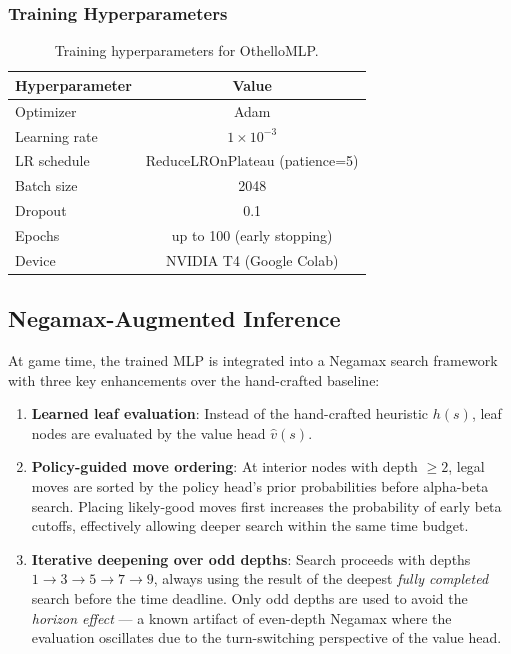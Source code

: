 \subsubsection{Training Hyperparameters}

\begin{table}[H]
    \centering
    \caption{Training hyperparameters for OthelloMLP.}
    \begin{tabular}{lc}
        \toprule
        \textbf{Hyperparameter} & \textbf{Value} \\
        \midrule
        Optimizer         & Adam \\
        Learning rate     & $1 \times 10^{-3}$ \\
        LR schedule       & ReduceLROnPlateau (patience=5) \\
        Batch size        & 2048 \\
        Dropout           & 0.1 \\
        Epochs            & up to 100 (early stopping) \\
        Device            & NVIDIA T4 (Google Colab) \\
        \bottomrule
    \end{tabular}
\end{table}

\subsection{Negamax-Augmented Inference}

At game time, the trained MLP is integrated into a Negamax search framework with three key enhancements over the hand-crafted baseline:

\begin{enumerate}
    \item \textbf{Learned leaf evaluation}: Instead of the hand-crafted heuristic $h(s)$, leaf nodes are evaluated by the value head $\hat{v}(s)$.

    \item \textbf{Policy-guided move ordering}: At interior nodes with depth $\geq 2$, legal moves are sorted by the policy head's prior probabilities before alpha-beta search. Placing likely-good moves first increases the probability of early beta cutoffs, effectively allowing deeper search within the same time budget.

    \item \textbf{Iterative deepening over odd depths}: Search proceeds with depths $1 \rightarrow 3 \rightarrow 5 \rightarrow 7 \rightarrow 9$, always using the result of the deepest \textit{fully completed} search before the time deadline. Only odd depths are used to avoid the \textit{horizon effect} — a known artifact of even-depth Negamax where the evaluation oscillates due to the turn-switching perspective of the value head.
\end{enumerate}

